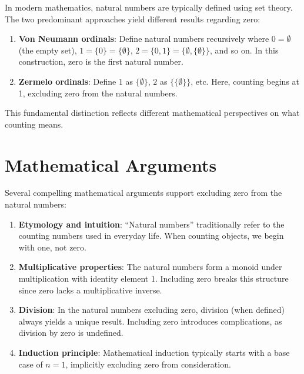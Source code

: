 \documentclass[../../../OAE-SPEC-MAIN.tex]{subfiles}
\begin{document}
In modern mathematics, natural numbers are typically defined using set theory. The two predominant approaches yield different results regarding zero:

\begin{enumerate}
\item \textbf{Von Neumann ordinals}: Define natural numbers recursively where $0 = \emptyset$ (the empty set), $1 = \{0\} = \{\emptyset\}$, $2 = \{0,1\} = \{\emptyset,\{\emptyset\}\}$, and so on. In this construction, zero is the first natural number.

\item \textbf{Zermelo ordinals}: Define $1$ as $\{\emptyset\}$, $2$ as $\{\{\emptyset\}\}$, etc. Here, counting begins at 1, excluding zero from the natural numbers.
\end{enumerate}


This fundamental distinction reflects different mathematical perspectives on what counting means.

\section{Mathematical Arguments}

Several compelling mathematical arguments support excluding zero from the natural numbers:

\begin{enumerate}
\item \textbf{Etymology and intuition}: ``Natural numbers'' traditionally refer to the counting numbers used in everyday life. When counting objects, we begin with one, not zero.

\item \textbf{Multiplicative properties}: The natural numbers form a monoid under multiplication with identity element 1. Including zero breaks this structure since zero lacks a multiplicative inverse.

\item \textbf{Division}: In the natural numbers excluding zero, division (when defined) always yields a unique result. Including zero introduces complications, as division by zero is undefined.

\item \textbf{Induction principle}: Mathematical induction typically starts with a base case of $n=1$, implicitly excluding zero from consideration.
\end{enumerate}
\end{document}
